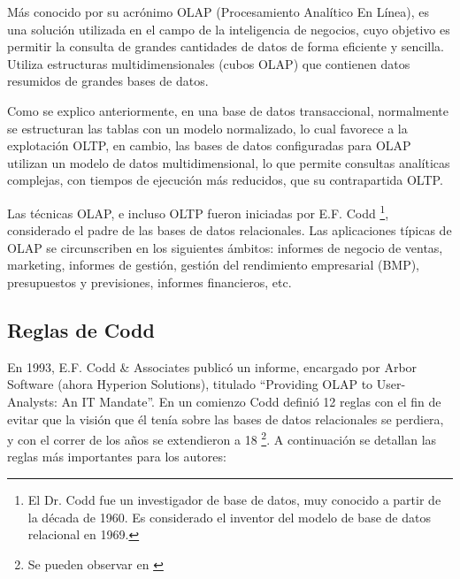\documentclass[a4paper,11pt]{article}
\begin{document}
    Más conocido por su acrónimo OLAP (Procesamiento Analítico En Línea), es una solución utilizada en el campo de la inteligencia de negocios, cuyo 
    objetivo es permitir la consulta de grandes cantidades de datos de forma eficiente y sencilla. Utiliza estructuras multidimensionales (cubos OLAP) que 
    contienen datos resumidos de grandes bases de datos.
    
    Como se explico anteriormente, en una base de datos transaccional, normalmente se estructuran las tablas con un modelo normalizado, lo cual favorece a
    la explotación OLTP, en cambio, las bases de datos configuradas para OLAP utilizan un modelo de datos multidimensional, lo que permite consultas 
    analíticas complejas, con tiempos de ejecución más reducidos, que su contrapartida OLTP.

    Las técnicas OLAP, e incluso OLTP fueron iniciadas por E.F. Codd \footnote{El Dr. Codd fue un investigador de base de datos, muy conocido a partir de la
    década de 1960. Es considerado el inventor del modelo de base de datos relacional en 1969.}, considerado el padre de las bases de datos
    relacionales. Las aplicaciones típicas de OLAP se circunscriben en los siguientes ámbitos: informes de negocio de ventas, marketing, informes de gestión,
    gestión del rendimiento empresarial (BMP), presupuestos y previsiones, informes financieros, etc.
    
    
    \subsection{Reglas de Codd}
    
    En 1993, E.F. Codd \& Associates publicó un informe, encargado por Arbor Software (ahora Hyperion Solutions), titulado ``Providing OLAP to User-Analysts:
    An IT Mandate''.
    En un comienzo Codd definió 12 reglas con el fin de evitar que la visión que él tenía sobre las bases de datos relacionales se perdiera, y con el correr
    de los años se extendieron a 18 \footnote{Se pueden observar en \cite[p.~205]{nagabhushana}}. A continuación se detallan las reglas más importantes 
    para los autores:
    
\end{document}

